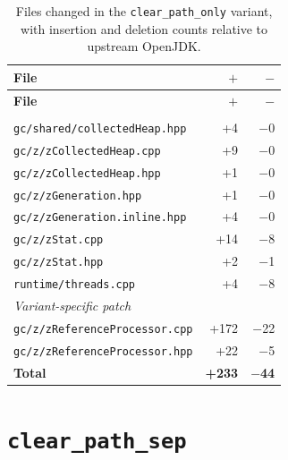 \begin{longtable}[c]{lrr}
\caption[File changes in \texttt{clear\_path\_only}]{Files changed in the \texttt{clear\_path\_only} variant, with insertion and deletion counts relative to upstream OpenJDK.} \label{tab:patch-clear-path-only} \\
\toprule
\textbf{File} & \textbf{$+$} & \textbf{$-$} \\
\midrule
\endfirsthead
\toprule
\textbf{File} & \textbf{$+$} & \textbf{$-$} \\
\midrule
\endhead
\bottomrule
\endfoot
\multicolumn{3}{l}{\textit{Base patch}} \\
\texttt{gc/shared/collectedHeap.hpp}     & +4  & $-$0 \\
\texttt{gc/z/zCollectedHeap.cpp}         & +9  & $-$0 \\
\texttt{gc/z/zCollectedHeap.hpp}         & +1  & $-$0 \\
\texttt{gc/z/zGeneration.hpp}            & +1  & $-$0 \\
\texttt{gc/z/zGeneration.inline.hpp}     & +4  & $-$0 \\
\texttt{gc/z/zStat.cpp}                  & +14 & $-$8 \\
\texttt{gc/z/zStat.hpp}                  & +2  & $-$1 \\
\texttt{runtime/threads.cpp}             & +4  & $-$8 \\
\multicolumn{3}{l}{\textit{Variant-specific patch}} \\
\texttt{gc/z/zReferenceProcessor.cpp}   & +172 & $-$22 \\
\texttt{gc/z/zReferenceProcessor.hpp}   & +22  & $-$5  \\
\midrule
\textbf{Total} & \textbf{+233} & \textbf{$-$44} \\
\end{longtable}

\section{\texttt{clear\_path\_sep}}


